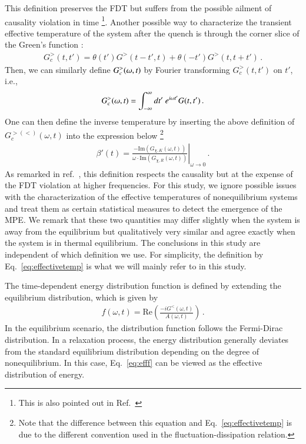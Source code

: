 This definition preserves the FDT but suffers from the possible ailment of causality violation in time \footnote{This is also pointed out in Ref.~\cite{almheiri2024universal}}. Another possible way to characterize the transient effective temperature of the system after the quench is through the corner slice of the Green's function \cite{almheiri2024universal}:
\begin{align}
    G_c^>(t,t')=\theta(t')G^>(t-t',t)+\theta(-t')G^>(t,t+t')\,.
\end{align}
Then, we can similarly define $G_c^>({\omega},t)$ by Fourier transforming $G_c^>(t,t')$ on $t'$, i.e.,
\begin{align}
    G_c^>({\omega},t)=\int_{-\infty}^\infty dt' \ e^{i \omega t'} G(t,t')\,.
\end{align}
One can then define the inverse temperature by inserting the above definition of $G_c^{>(<)}(\omega,t)$ into the expression below \footnote{Note that the difference between this equation and Eq.~\eqref{eq:effectivetemp} is due to the different convention used in the fluctuation-dissipation relation.}
\begin{align}
      \beta'(t)=\left.\frac{-\mathrm{Im}(G_{\chi,K}(\omega,t))}{\omega \cdot \mathrm{Im}(G_{\chi,R}(\omega,t))}\right|_{\omega\rightarrow 0}\,. \label{eqbeta2}
\end{align}
As remarked in ref.~\cite{almheiri2024universal}, this definition respects the causality but at the expense of the FDT violation at higher frequencies. For this study, we ignore possible issues with the characterization of the effective temperatures of nonequilibrium systems and treat them as certain statistical measures to detect the emergence of the MPE. We remark that these two quantities may differ slightly when the system is away from the equilibrium but qualitatively very similar and agree exactly when the system is in thermal equilibrium. The conclusions in this study are independent of which definition we use. For simplicity, the definition by Eq.~\eqref{eq:effectivetemp} is what we will mainly refer to in this study. 

The time-dependent energy distribution function is defined by extending the equilibrium distribution, which is given by
\begin{align}
    f(\omega,t)={\mathrm{Re}}\left(\frac{-i G^<(\omega,t)}{A(\omega,t)}\right)\,.
    \label{eq:efff}
\end{align}
In the equilibrium scenario, the distribution function follows the Fermi-Dirac distribution. In a relaxation process, the energy distribution generally deviates from the standard equilibrium distribution depending on the degree of nonequilibrium. In this case, Eq.~\eqref{eq:efff} can be viewed as the effective distribution of energy. 

